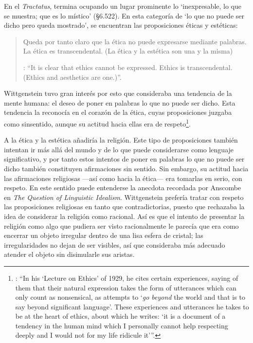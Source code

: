En el \emph{Tractatus}, termina ocupando un lugar prominente lo \enquote*{inexpresable, lo que se muestra; que es lo místico} (\S6.522). En esta categoría de `lo que no puede ser dicho pero queda mostrado', se encuentran las proposiciones éticas y estéticas: \blockquote[{\Cite[\S6.421]{wittgenstein1922tractatus}}: \enquote{It is clear that ethics cannot be expressed. Ethics is transcendental. (Ethics and aesthetics are one.)}.]{Queda por tanto claro que la ética no puede expresarse mediante palabras. La ética es transcendental. (La ética y la estética son una y la misma)}. Wittgenstein tuvo gran interés por esto que consideraba una tendencia de la mente humana: el deseo de poner en palabras lo que no puede ser dicho. Esta tendencia la reconocía en el corazón de la ética, cuyas proposiciones juzgaba como sinsentido, aunque su actitud hacia ellas era de respeto\footnote{\cite[Cf.][211]{teichmann2008ans}: \enquote{In his `Lecture on Ethics' of 1929, he cites certain experiences, saying of them that their natural expression takes the form of utterances which can only count as nonsensical, as attempts to `\emph{go beyond} the world and that is to say beyond significant language'. These experiences and utterances he takes to be at the heart of ethics, about which he writes: `it is a document of a tendency in the human mind which I personally cannot help respecting deeply and I would not for my life ridicule it'}.}.

A la ética y la estética añadiría la religión. Este tipo de proposiciones también intentan ir más allá del mundo y de lo que puede considerarse como lenguaje significativo, y por tanto estos intentos de poner en palabras lo que no puede ser dicho también constituyen afirmaciones sin sentido. Sin embargo, su actitud hacia las afirmaciones religiosas ---así como hacia la ética--- era tomarlas en serio, con respeto. En este sentido puede entenderse la anecdota recordada por Anscombe en \emph{The Question of Linguistic Idealism}. Wittgenstein prefería tratar con respeto las proposiciones religiosas en tanto que contradictorias, puesto que rechazaba la idea de considerar la religión como racional. Así es que el intento de presentar la religión como algo que pudiera ser visto racionalmente le parecía que era como encerrar un objeto irregular dentro de una lisa esfera de cristal; las irregularidades no dejan de ser visibles, así que consideraba más adecuado atender el objeto sin disimularle sus aristas.


